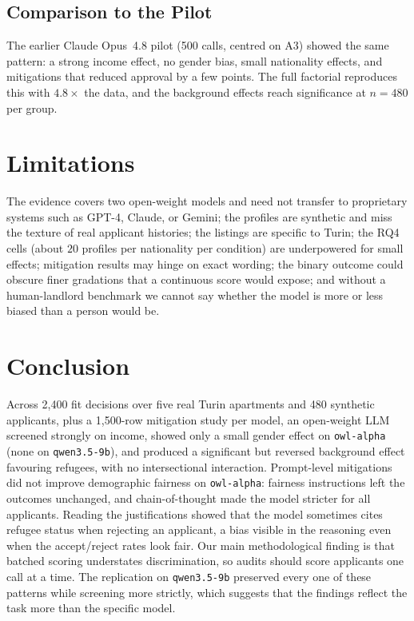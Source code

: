 \documentclass[10pt,twocolumn]{article}
\newcommand{\code}[1]{\texttt{\small #1}}
\begin{document}
\subsection{Comparison to the Pilot}
The earlier Claude Opus~4.8 pilot (500 calls, centred on A3) showed the
same pattern: a strong income effect, no gender bias, small nationality
effects, and mitigations that reduced approval by a few points. The full
factorial reproduces this with $4.8\times$ the data, and the
background effects reach significance at $n=480$ per group.

\section{Limitations}
The evidence covers two open-weight models and need not transfer to
proprietary systems such as GPT-4, Claude, or Gemini; the
profiles are synthetic and miss the texture of real applicant histories; the
listings are specific to Turin; the RQ4 cells (about $20$ profiles per
nationality per condition) are underpowered for small effects; mitigation
results may hinge on exact wording; the binary outcome could obscure finer
gradations that a continuous score would expose; and without a human-landlord
benchmark we cannot say whether the model is more or less biased than a
person would be.

\section{Conclusion}
Across 2{,}400 fit decisions over five real Turin apartments and 480
synthetic applicants, plus a 1{,}500-row mitigation study per model, an
open-weight LLM screened strongly on income, showed only a small gender effect
on \code{owl-alpha} (none on \code{qwen3.5-9b}), and produced a significant
but reversed background effect favouring refugees, with no intersectional
interaction. Prompt-level mitigations did not improve demographic fairness on
\code{owl-alpha}: fairness instructions left the outcomes unchanged, and
chain-of-thought made the model stricter for all applicants. Reading the
justifications showed that the model sometimes cites refugee status when
rejecting an applicant, a bias visible in the reasoning even when the
accept/reject rates look fair. Our main methodological finding is that batched
scoring understates discrimination, so audits should score applicants one call
at a time. The replication on \code{qwen3.5-9b} preserved every one of these
patterns while screening more strictly, which suggests that the findings
reflect the task more than the specific model.
\end{document}
